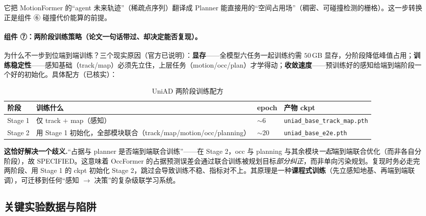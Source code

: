 \begin{insight}
它把 MotionFormer 的“agent 未来轨迹”（稀疏点序列）翻译成 Planner 能直接用的“空间占用场”（稠密、可碰撞检测的栅格）。这一步转换正是组件 ⑥ 碰撞代价能算的前提。
\end{insight}

\paragraph{组件 ⑦：两阶段训练策略（论文一句话带过、却决定能否复现）。}
为什么不一步到位端到端训练？三个现实原因（官方已说明）：\textbf{显存}——全模型六任务一起训练约需 $50$\,GB 显存，分阶段降低峰值占用；\textbf{训练稳定性}——感知基础（track/map）必须先立住，上层任务（motion/occ/plan）才学得动；\textbf{收敛速度}——预训练好的感知给端到端阶段一个好的初始化。具体配方（已核实）：

\begin{table}[H]\centering\small
\caption{UniAD 两阶段训练配方}
\label{tab:de-uniad-stages}
\begin{tabular}{p{} p{} p{} p{}}
\toprule
阶段 & 训练什么 & epoch & 产物 ckpt \\
\midrule
Stage 1 & 仅 track $+$ map（感知） & $\sim 6$ & \texttt{uniad\_base\_track\_map.pth} \\
Stage 2 & 用 Stage 1 初始化，全部模块联合（track/map/motion/occ/planning） & $\sim 20$ & \texttt{uniad\_base\_e2e.pth} \\
\bottomrule
\end{tabular}
\end{table}

\begin{note}
\textbf{这恰好解决一个歧义.}\;“占据与 planner 是否端到端联合训练”——在 Stage 2，occ 与 planning 与其余模块\emph{一起}端到端联合优化（而非各自分阶段），故 SPECIFIED。这意味着 OccFormer 的占据预测误差会通过联合训练被规划目标\emph{部分纠正}，而非单向污染规划。复现时务必走完两阶段、用 Stage 1 的 ckpt 初始化 Stage 2，跳过会导致训练不稳、指标对不上。其原理是一种\textbf{课程式训练}（先立感知地基、再端到端联调），可迁移到任何“感知 $\to$ 决策”的复杂级联学习系统。
\end{note}

\subsection{关键实验数据与陷阱}
\label{sec:de-uniad-exp}

